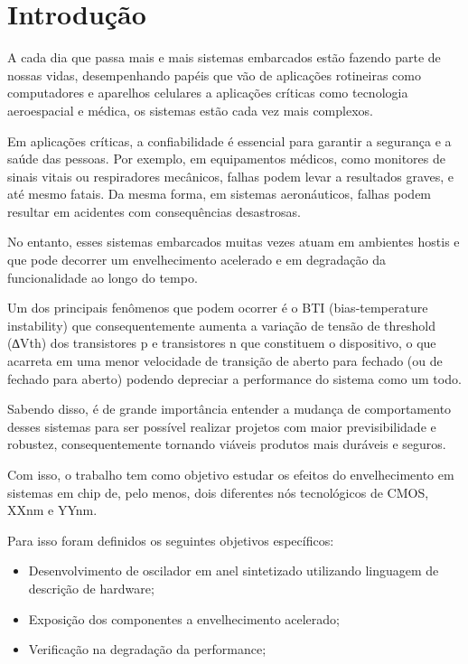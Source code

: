 	\chapter{Introdução}

A cada dia que passa mais e mais sistemas embarcados estão fazendo parte de nossas vidas, desempenhando papéis que vão de aplicações rotineiras como computadores e aparelhos celulares a aplicações críticas como tecnologia aeroespacial e médica, os sistemas estão cada vez mais complexos.

Em aplicações críticas, a confiabilidade é essencial para garantir a segurança e a saúde das pessoas. Por exemplo, em equipamentos médicos, como monitores de sinais vitais ou respiradores mecânicos, falhas podem levar a resultados graves, e até mesmo fatais. Da mesma forma, em sistemas aeronáuticos, falhas podem resultar em acidentes com consequências desastrosas.

No entanto, esses sistemas embarcados muitas vezes atuam em ambientes hostis e que pode decorrer um envelhecimento acelerado e em degradação da funcionalidade ao longo do tempo.

Um dos principais fenômenos que podem ocorrer é o BTI (bias-temperature instability) que consequentemente aumenta a variação de tensão de threshold (∆Vth) dos transistores p e transistores n que constituem o dispositivo, o que acarreta em uma menor velocidade de transição de aberto para fechado (ou de fechado para aberto) podendo depreciar a performance do sistema como um todo.

Sabendo disso, é de grande importância entender a mudança de comportamento desses sistemas para ser possível realizar projetos com maior previsibilidade e robustez, consequentemente tornando viáveis produtos mais duráveis e seguros.

Com isso, o trabalho tem como objetivo estudar os efeitos do envelhecimento em sistemas em chip de, pelo menos, dois diferentes nós tecnológicos de CMOS, XXnm e YYnm.

Para isso foram definidos os seguintes objetivos específicos:
\begin{itemize}
    \item Desenvolvimento de oscilador em anel sintetizado utilizando linguagem de descrição de hardware;
    \item Exposição dos componentes a envelhecimento acelerado;
    \item Verificação na degradação da performance;
\end{itemize}
